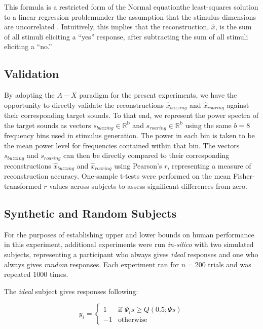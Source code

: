 \documentclass[journal]{IEEEtran}
\begin{document}
This formula is a restricted form of the Normal equation\textemdash{}the least-squares solution to a linear regression problem\textemdash{}under
the assumption that the stimulus dimensions are uncorrelated \cite{gosselinSuperstitiousPerceptionsReveal2003}.
Intuitively, this implies that the reconstruction, $\hat{x}$, is the sum of all stimuli eliciting a ``yes'' response, after subtracting the sum of all stimuli eliciting a ``no.'' 

\subsection{Validation}

By adopting the $A-X$ paradigm for the present experiments,
we have the opportunity to directly validate the reconstructions
$\hat{x}_{buzzing}$ and $\hat{x}_{roaring}$ against their corresponding target sounds.
To that end, we represent the power spectra of the target sounds as vectors $s_{buzzing} \in \mathbb{R}^\mathrm{b}$ and $s_{roaring} \in \mathbb{R}^\mathrm{b}$ using the same $b=8$ frequency bins used in stimulus generation.
The power in each bin is taken to be the mean power level for frequencies contained within that bin.
The vectors $s_{buzzing}$ and $s_{roaring}$ can then be directly compared to their corresponding reconstructions
$\hat{x}_{buzzing}$ and $\hat{x}_{roaring}$ using Pearson's $r$, representing a measure of reconstruction accuracy.
One-sample t-tests were performed on the mean Fisher-transformed $r$ values across subjects to assess significant differences from zero.

\subsection{Synthetic and Random Subjects}

For the purposes of establishing upper and lower bounds on human performance in this experiment,
additional experiments were run \textit{in-silico} with two simulated subjects,
representing a participant who always gives \textit{ideal} responses and one who always gives \textit{random} responses.
Each experiment ran for $n=200$ trials and was repeated $1000$ times.

The \textit{ideal} subject gives responses following:

\begin{equation}
    y_i =
        \begin{cases}
            1 & \text{if } \Psi_i s \geq Q(0.5; \Psi s) \\
            -1 & \text{otherwise}
        \end{cases}
\end{equation}
\end{document}
